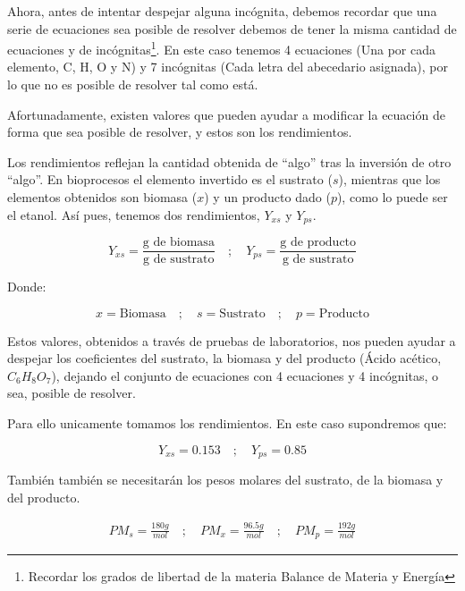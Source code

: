 Ahora, antes de intentar despejar alguna incógnita, debemos recordar que una serie de ecuaciones sea posible de resolver debemos de tener la misma cantidad de ecuaciones y de incógnitas\footnote{Recordar los grados de libertad de la materia Balance de Materia y Energía}. En este caso tenemos 4 ecuaciones (Una por cada elemento, C, H, O y N) y 7 incógnitas (Cada letra del abecedario asignada), por lo que no es posible de resolver tal como está.

Afortunadamente, existen valores que pueden ayudar a modificar la ecuación de forma que sea posible de resolver, y estos son los rendimientos.

Los rendimientos reflejan la cantidad obtenida de ``algo'' tras la inversión de otro ``algo''. En bioprocesos el elemento invertido es el sustrato ($s$), mientras que los elementos obtenidos son biomasa ($x$) y un producto dado ($p$), como lo  puede ser el etanol. Así pues, tenemos dos rendimientos, $Y_{xs}$ y $Y_{ps}$.

\begin{equation*}
    Y_{xs} = \frac{\text{g de biomasa}}{\text{g de sustrato}} \quad ; \quad Y_{ps} = \frac{\text{g de producto}}{\text{g de sustrato}}
\end{equation*}

Donde: 

\begin{equation*}
    x = \text{Biomasa} \quad ; \quad s = \text{Sustrato} \quad ; \quad p = \text{Producto}
\end{equation*}

Estos valores, obtenidos a través de pruebas de laboratorios, nos pueden ayudar a despejar los coeficientes del sustrato, la biomasa y del producto (Ácido acético, $C_{6}H_{8}O_{7}$), dejando el conjunto de ecuaciones con 4 ecuaciones y 4 incógnitas, o sea, posible de resolver.

Para ello unicamente tomamos los rendimientos. En este caso supondremos que:

\begin{equation*}
    Y_{xs} = 0.153 \quad ; \quad Y_{ps} = 0.85
\end{equation*}

También también se necesitarán los pesos molares del sustrato, de la biomasa y del producto.

\begin{align*}
    PM_{s} = \frac{180g}{mol} \quad ; \quad PM_{x} = \frac{96.5g}{mol} \quad ; \quad PM_{p} = \frac{192g}{mol}
\end{align*}

